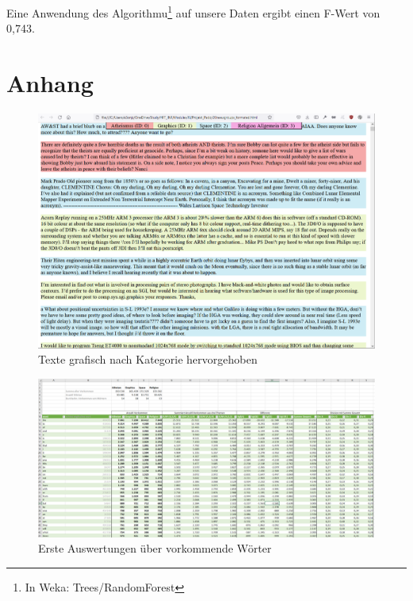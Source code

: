 \documentclass[
	11pt,
	a4paper
]{scrartcl}
\begin{document}
Eine Anwendung des Algorithmu\footnote{In Weka: Trees/RandomForest} auf unsere Daten ergibt einen F-Wert von 0,743.

\newpage
\section{Anhang}

\begin{figure}[H]
	\includegraphics[width=\textwidth]{figures/texte_grafisch_getrennt.png}
	\caption{Texte grafisch nach Kategorie hervorgehoben}
	\label{fig:texte_grafisch_getrennt}
\end{figure}

\begin{figure}[H]
	\includegraphics[width=\textwidth]{figures/wort_auswertung_excel.png}
	\caption{Erste Auswertungen über vorkommende Wörter}
	\label{fig:wort_auswertung_excel}
\end{figure}
\end{document}
